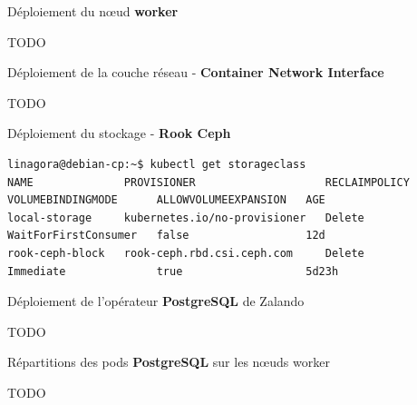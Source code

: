 
\begin{frame}[fragile]{Déploiement du n{\oe}ud \textbf{worker}}

TODO

\end{frame}


\begin{frame}[fragile]{Déploiement de la couche réseau - \textbf{Container Network Interface}}

TODO

\end{frame}


\begin{frame}[fragile]{Déploiement du stockage - \textbf{Rook Ceph}}

\begin{tiny}
\begin{Verbatim}[commandchars=\\\{\}]
linagora@debian-cp:~$ kubectl get storageclass
NAME              PROVISIONER                    RECLAIMPOLICY   VOLUMEBINDINGMODE      ALLOWVOLUMEEXPANSION   AGE
local-storage     kubernetes.io/no-provisioner   Delete          WaitForFirstConsumer   false                  12d
rook-ceph-block   rook-ceph.rbd.csi.ceph.com     Delete          Immediate              true                   5d23h
\end{Verbatim}
\end{tiny}

\end{frame}


\begin{frame}[fragile]{Déploiement de l'opérateur \textbf{PostgreSQL} de Zalando}

TODO

\end{frame}


\begin{frame}[fragile]{Répartitions des pods \textbf{PostgreSQL} sur les n{\oe}uds worker}

TODO

\end{frame}

